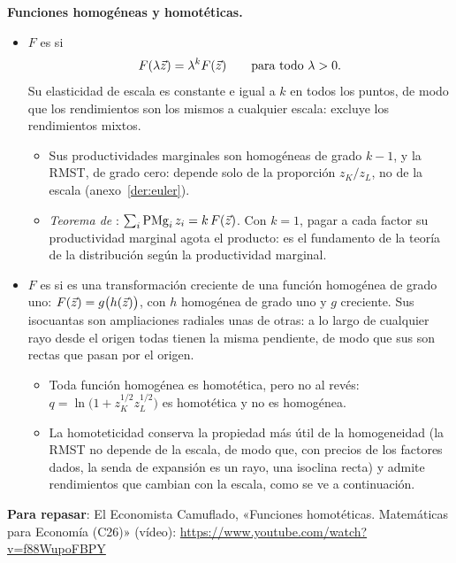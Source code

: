 \documentclass[11pt]{article}
\begin{document}
\begin{anotaciones}
\textbf{Funciones homogéneas y homotéticas.}
\begin{itemize}
\item $F$ es  si
  \begin{equation}
  F(\lambda\vec{z})=\lambda^kF(\vec{z})\qquad\text{para todo }\lambda>0. \label{eq:homogenea}
  \end{equation}
  Su elasticidad de escala es constante e igual a $k$ en todos los puntos, de modo que los rendimientos son los mismos a cualquier escala: excluye los rendimientos mixtos.
  \begin{itemize}
  \item Sus productividades marginales son homogéneas de grado $k-1$, y la RMST, de grado cero: depende solo de la proporción $z_K/z_L$, no de la escala (anexo~\ref{der:euler}).
  \item \emph{Teorema de }: $\sum_i\mathrm{PMg}_i\,z_i=k\,F(\vec{z})$. Con $k=1$, pagar a cada factor su productividad marginal agota el producto\nocite{Wicksteed1894Essay}: es el fundamento de la teoría de la distribución según la productividad marginal.
  \end{itemize}
\item $F$ es  si es una transformación creciente de una función homogénea de grado uno: $F(\vec{z})=g\big(h(\vec{z})\big)$, con $h$ homogénea de grado uno y $g$ creciente. Sus isocuantas son ampliaciones radiales unas de otras: a lo largo de cualquier rayo desde el origen todas tienen la misma pendiente, de modo que sus  son rectas que pasan por el origen.
  \begin{itemize}
  \item Toda función homogénea es homotética, pero no al revés: $q=\ln\big(1+z_K^{1/2}z_L^{1/2}\big)$ es homotética y no es homogénea.
  \item La homoteticidad conserva la propiedad más útil de la homogeneidad (la RMST no depende de la escala, de modo que, con precios de los factores dados, la senda de expansión es un rayo, una isoclina recta) y admite rendimientos que cambian con la escala, como se ve a continuación.
  \end{itemize}
\end{itemize}
\textbf{Para repasar}: El Economista Camuflado, «Funciones homotéticas. Matemáticas para Economía (C26)» (vídeo): \url{https://www.youtube.com/watch?v=f88WupoFBPY}
\end{anotaciones}
\end{document}
